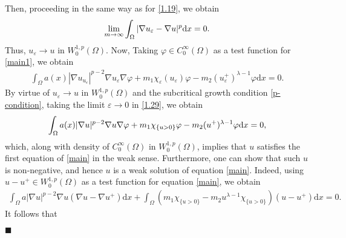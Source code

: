 \documentclass[onecolumn]{autart}
\newenvironment{proof}{{\it Proof: \enspace}}{\hfill $\blacksquare$\par}
\begin{document}
\begin{proof}
		Then, proceeding in the same way as for \eqref{1.19}, we obtain
		\begin{align}
			\lim_{m \to \infty} \int_{\Omega}|\nabla u_{\varepsilon} - \nabla u|^{p} \mathrm{d}x=0.\notag
		\end{align}
		Thus, $u_{\varepsilon} \to u $ in $ W^{1,p}_0(\Omega)$.
		Now, Taking $\varphi \in C_{0}^{\infty}(\Omega)$ as a test function for \eqref{main1}, we obtain
		\begin{align}\label{1.29}
			\int_{\Omega} a(x)|\nabla u_{u_{\varepsilon}}|^{p-2}\nabla u_{\varepsilon} \nabla\varphi  + m_1 \chi_{\varepsilon}(u_{\varepsilon})\varphi- m_2 (u_{\varepsilon}^{+})^{\lambda-1}\varphi\mathrm{d}x=0.
		\end{align}
		By virtue of $u_{\varepsilon} \to u$ in $W^{1,p}_0(\Omega)$  and  the subcritical growth condition \eqref{p-condition}, taking the limit $\varepsilon \to 0$ in \eqref{1.29}, we obtain
		\begin{align}
			\int_{\Omega} a(x)|\nabla u|^{p-2}\nabla u \nabla\varphi + m_1 \chi_{\{u>0\}}\varphi- m_2 (u^{+})^{\lambda-1}\varphi\mathrm{d}x=0,\notag
		\end{align}
		which, along with density of $C_{0}^{\infty}(\Omega)$ in $W^{1,p}_0(\Omega) $, implies that  $u$ satisfies the first equation of \eqref{main} in the weak sense. %
		Furthermore, one can show that such $u$ is non-negative,  and hence $u$ is  a weak solution of equation \eqref{main}. Indeed, using $u-u^+\in W^{1,p}_0(\Omega)$ as  a test  function for equation   \eqref{main}, we obtain
		\begin{align*}
			\int_{\Omega}a|\nabla u|^{p-2}\nabla u (\nabla u -\nabla u^+)\mathrm{d}x + \int_{\Omega} (m_1 \chi_{\{u>0\}} - m_2 u^{\lambda - 1} \chi_{\{u > 0\}}  )(u-u^+) \mathrm{d}x =0.
		\end{align*}
		It follows that
		\begin{align*}

\end{align*}
\end{proof}
\end{document}
